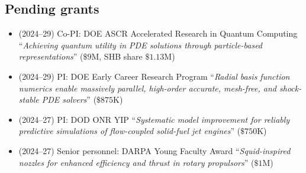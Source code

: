 \subsection{Pending grants}

\begin{itemize}
    \item (2024--29) Co-PI: DOE ASCR Accelerated Research in Quantum Computing ``\textit{Achieving quantum utility in PDE solutions through particle-based representations}'' ($\$9$M, SHB share $\$1.13$M)
    \item (2024--29) PI: DOE Early Career Research Program ``\textit{Radial basis function numerics enable massively parallel, high-order accurate, mesh-free, and shock-stable PDE solvers}'' ($\$875$K)
    \item (2024--27) PI: DOD ONR YIP ``\textit{Systematic model improvement for reliably predictive simulations of flow-coupled solid-fuel jet engines}'' ($\$750$K)
    \item (2024--27) Senior personnel: DARPA Young Faculty Award ``\textit{Squid-inspired nozzles for enhanced  efficiency and thrust in rotary propulsors}'' ($\$1$M)
\end{itemize}
